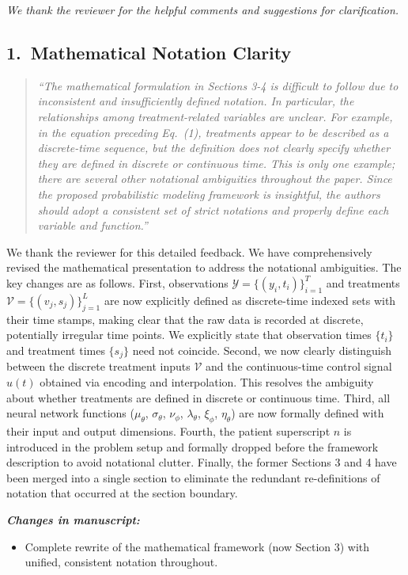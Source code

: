 \documentclass[12pt]{article}
\newcommand{\reviewercomment}[1]{%
  \begin{quote}
  \textcolor{reviewergray}{\textit{``#1''}}
  \end{quote}
}
\newcommand{\changes}{\vspace{0.3em}\noindent\textbf{\textit{Changes in manuscript:}}\vspace{0.2em}}
\begin{document}
\textit{We thank the reviewer for the helpful comments and suggestions for clarification.}

\subsection*{1.\ Mathematical Notation Clarity}

\reviewercomment{The mathematical formulation in Sections 3-4 is difficult to follow due to inconsistent and insufficiently defined notation. In particular, the relationships among treatment-related variables are unclear. For example, in the equation preceding Eq.\ (1), treatments appear to be described as a discrete-time sequence, but the definition does not clearly specify whether they are defined in discrete or continuous time. This is only one example; there are several other notational ambiguities throughout the paper. Since the proposed probabilistic modeling framework is insightful, the authors should adopt a consistent set of strict notations and properly define each variable and function.}

We thank the reviewer for this detailed feedback. We have comprehensively revised the mathematical presentation to address the notational ambiguities. The key changes are as follows. First, observations $\mathcal{Y} = \{(y_i, t_i)\}_{i=1}^{T}$ and treatments $\mathcal{V} = \{(v_j, s_j)\}_{j=1}^{L}$ are now explicitly defined as discrete-time indexed sets with their time stamps, making clear that the raw data is recorded at discrete, potentially irregular time points. We explicitly state that observation times $\{t_i\}$ and treatment times $\{s_j\}$ need not coincide. Second, we now clearly distinguish between the discrete treatment inputs $\mathcal{V}$ and the continuous-time control signal $u(t)$ obtained via encoding and interpolation. This resolves the ambiguity about whether treatments are defined in discrete or continuous time. Third, all neural network functions ($\mu_\theta$, $\sigma_\theta$, $\nu_\phi$, $\lambda_\theta$, $\xi_\phi$, $\eta_\theta$) are now formally defined with their input and output dimensions. Fourth, the patient superscript $n$ is introduced in the problem setup and formally dropped before the framework description to avoid notational clutter. Finally, the former Sections 3 and 4 have been merged into a single section to eliminate the redundant re-definitions of notation that occurred at the section boundary.

\changes
\begin{itemize}[leftmargin=2em]
\item Complete rewrite of the mathematical framework (now Section 3) with unified, consistent notation throughout.
\end{itemize}
\end{document}
